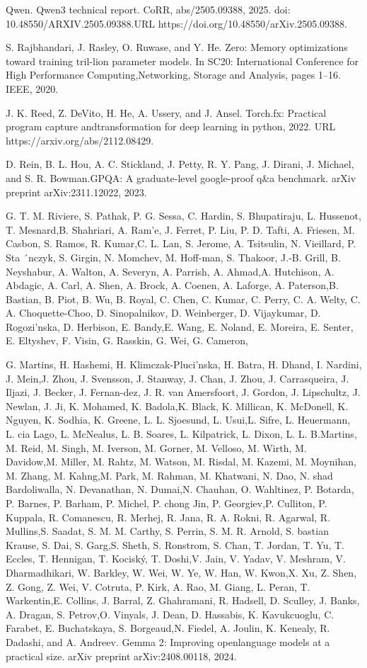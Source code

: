 \documentclass[
  10
]{article}
\begin{document}
Qwen. Qwen3 technical report. CoRR, abs/2505.09388, 2025. doi:
10.48550/ARXIV.2505.09388.URL https://doi.org/10.48550/arXiv.2505.09388.

S. Rajbhandari, J. Rasley, O. Ruwase, and Y. He. Zero: Memory
optimizations toward training tril-lion parameter models. In SC20:
International Conference for High Performance Computing,Networking,
Storage and Analysis, pages 1--16. IEEE, 2020.

J. K. Reed, Z. DeVito, H. He, A. Ussery, and J. Ansel. Torch.fx:
Practical program capture andtransformation for deep learning in python,
2022. URL https://arxiv.org/abs/2112.08429.

D. Rein, B. L. Hou, A. C. Stickland, J. Petty, R. Y. Pang, J. Dirani, J.
Michael, and S. R. Bowman.GPQA: A graduate-level google-proof q\&a
benchmark. arXiv preprint arXiv:2311.12022, 2023.

G. T. M. Riviere, S. Pathak, P. G. Sessa, C. Hardin, S. Bhupatiraju, L.
Hussenot, T. Mesnard,B. Shahriari, A. Ram'e, J. Ferret, P. Liu, P. D.
Tafti, A. Friesen, M. Casbon, S. Ramos, R. Kumar,C. L. Lan, S. Jerome,
A. Tsitsulin, N. Vieillard, P. Sta ´nczyk, S. Girgin, N. Momchev, M.
Hoff-man, S. Thakoor, J.-B. Grill, B. Neyshabur, A. Walton, A. Severyn,
A. Parrish, A. Ahmad,A. Hutchison, A. Abdagic, A. Carl, A. Shen, A.
Brock, A. Coenen, A. Laforge, A. Paterson,B. Bastian, B. Piot, B. Wu, B.
Royal, C. Chen, C. Kumar, C. Perry, C. A. Welty, C. A. Choquette-Choo,
D. Sinopalnikov, D. Weinberger, D. Vijaykumar, D. Rogozi'nska, D.
Herbison, E. Bandy,E. Wang, E. Noland, E. Moreira, E. Senter, E.
Eltyshev, F. Visin, G. Rasskin, G. Wei, G. Cameron,

G. Martins, H. Hashemi, H. Klimczak-Pluci'nska, H. Batra, H. Dhand, I.
Nardini, J. Mein,J. Zhou, J. Svensson, J. Stanway, J. Chan, J. Zhou, J.
Carrasqueira, J. Iljazi, J. Becker, J. Fernan-dez, J. R. van Amersfoort,
J. Gordon, J. Lipschultz, J. Newlan, J. Ji, K. Mohamed, K. Badola,K.
Black, K. Millican, K. McDonell, K. Nguyen, K. Sodhia, K. Greene, L. L.
Sjoesund, L. Usui,L. Sifre, L. Heuermann, L. cia Lago, L. McNealus, L.
B. Soares, L. Kilpatrick, L. Dixon, L. L. B.Martins, M. Reid, M. Singh,
M. Iverson, M. Gorner, M. Velloso, M. Wirth, M. Davidow,M. Miller, M.
Rahtz, M. Watson, M. Risdal, M. Kazemi, M. Moynihan, M. Zhang, M.
Kahng,M. Park, M. Rahman, M. Khatwani, N. Dao, N. shad Bardoliwalla, N.
Devanathan, N. Dumai,N. Chauhan, O. Wahltinez, P. Botarda, P. Barnes, P.
Barham, P. Michel, P. chong Jin, P. Georgiev,P. Culliton, P. Kuppala, R.
Comanescu, R. Merhej, R. Jana, R. A. Rokni, R. Agarwal, R. Mullins,S.
Saadat, S. M. M. Carthy, S. Perrin, S. M. R. Arnold, S. bastian Krause,
S. Dai, S. Garg,S. Sheth, S. Ronstrom, S. Chan, T. Jordan, T. Yu, T.
Eccles, T. Hennigan, T. Kociský, T. Doshi,V. Jain, V. Yadav, V. Meshram,
V. Dharmadhikari, W. Barkley, W. Wei, W. Ye, W. Han, W. Kwon,X. Xu, Z.
Shen, Z. Gong, Z. Wei, V. Cotruta, P. Kirk, A. Rao, M. Giang, L. Peran,
T. Warkentin,E. Collins, J. Barral, Z. Ghahramani, R. Hadsell, D.
Sculley, J. Banks, A. Dragan, S. Petrov,O. Vinyals, J. Dean, D.
Hassabis, K. Kavukcuoglu, C. Farabet, E. Buchatskaya, S. Borgeaud,N.
Fiedel, A. Joulin, K. Kenealy, R. Dadashi, and A. Andreev. Gemma 2:
Improving openlanguage models at a practical size. arXiv preprint
arXiv:2408.00118, 2024.
\end{document}
